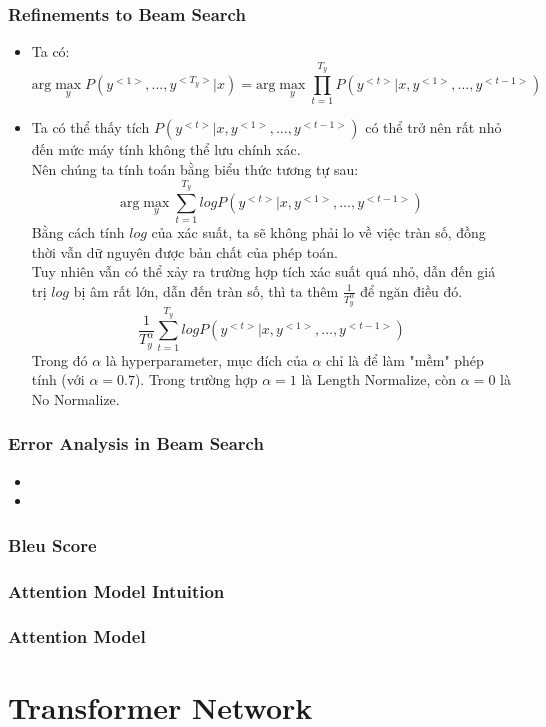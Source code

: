 \documentclass[12pt,a4paper]{report}
\begin{document}
	\subsection{Refinements to Beam Search}
		\begin{itemize}
		\item Ta có: \[\text{arg} \max_{y}P(y^{<1>},\dots,y^{<T_y>}|x) = \text{arg} \max_{y}\prod^{T_y}_{t=1}P(y^{<t>}|x,y^{<1>},\dots,y^{<t-1>})\]
		\item Ta có thể thấy tích $P(y^{<t>}|x,y^{<1>},\dots,y^{<t-1>})$ có thể trở nên rất nhỏ đến mức máy tính không thể lưu chính xác.\\Nên chúng ta tính toán bằng biểu thức tương tự sau:
		\[\text{arg} \max_{y}\sum^{T_y}_{t=1}logP(y^{<t>}|x,y^{<1>},\dots,y^{<t-1>})\]
		Bằng cách tính $log$ của xác suất, ta sẽ không phải lo về việc tràn số, đồng thời vẫn dữ nguyên được bản chất của phép toán.\\
		Tuy nhiên vẫn có thể xảy ra trường hợp tích xác suất quá nhỏ, dẫn đến giá trị $log$ bị âm rất lớn, dẫn đến tràn số, thì ta thêm $\frac{1}{T_y^{\alpha}}$ để ngăn điều đó.
		\[\frac{1}{T_y^{\alpha}}\sum^{T_y}_{t=1}logP(y^{<t>}|x,y^{<1>},\dots,y^{<t-1>})\]
		Trong đó $\alpha$ là hyperparameter, mục đích của $\alpha$ chỉ là để làm "mềm" phép tính (với $\alpha = 0.7$). Trong trường hợp $\alpha = 1$ là Length Normalize, còn $\alpha = 0$ là No Normalize.
		\end{itemize}
	\subsection{Error Analysis in Beam Search}
		\begin{itemize}
		\item
		\item
		\end{itemize}
	\subsection{Bleu Score}
	\subsection{Attention Model Intuition}
	\subsection{Attention Model}
\chapter{Transformer Network}
\end{document}
